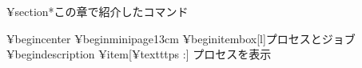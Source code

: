 {%
%
%
%
%
%
%
%
%
%
%
%
%
%
%
%
%
%
%
%
%
%
%
%
%
¥section*{この章で紹介したコマンド}

¥begin{center}
¥begin{minipage}{13cm}
¥begin{itembox}[l]{プロセスとジョブ}
¥begin{description}
¥item[¥texttt{ps} :] プロセスを表示

}
